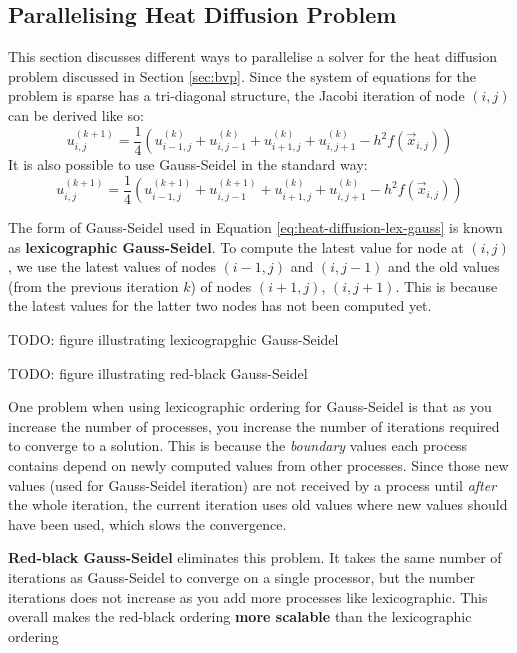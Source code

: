 \documentclass{article}
\begin{document}
\subsection{Parallelising Heat Diffusion Problem}
\label{sec:heat-diffusion-parallel}

This section discusses different ways to parallelise a solver for the heat diffusion problem discussed in Section \ref{sec:bvp}. Since the system of equations for the problem is sparse has a tri-diagonal structure, the Jacobi iteration of node $(i, j)$ can be derived like so:
\begin{equation}
	u_{i,j}^{(k + 1)} = \frac{1}{4}\left( u_{i-1,j}^{(k)} + u_{i,j-1}^{(k)} + u_{i+1,j}^{(k)} + u_{i,j+1}^{(k)} - h^2f(\vec{x}_{i,j}) \right)
	\label{eq:heat-diffusion-jacobi}
\end{equation}
It is also possible to use Gauss-Seidel in the standard way:
\begin{equation}
	u_{i,j}^{(k + 1)} = \frac{1}{4}\left( u_{i-1,j}^{(k+1)} + u_{i,j-1}^{(k+1)} + u_{i+1,j}^{(k)} + u_{i,j+1}^{(k)} - h^2f(\vec{x}_{i,j}) \right)
	\label{eq:heat-diffusion-lex-gauss}
\end{equation}

The form of Gauss-Seidel used in Equation \ref{eq:heat-diffusion-lex-gauss} is known as \textbf{lexicographic Gauss-Seidel}. To compute the latest value for node at $(i, j)$, we use the latest values of nodes $(i - 1, j)$ and $(i, j - 1)$ and the old values (from the previous iteration $k$) of nodes $(i + 1, j)$, $(i, j + 1)$. This is because the latest values for the latter two nodes has not been computed yet.

TODO: figure illustrating lexicograpghic Gauss-Seidel

TODO: figure illustrating red-black Gauss-Seidel

One problem when using lexicographic ordering for Gauss-Seidel is that as you increase the number of processes, you increase the number of iterations required to converge to a solution. This is because the \textit{boundary} values each process contains depend on newly computed values from other processes. Since those new values (used for Gauss-Seidel iteration) are not received by a process until \textit{after} the whole iteration, the current iteration uses old values where new values should have been used, which slows the convergence.

\textbf{Red-black Gauss-Seidel} eliminates this problem. It takes the same number of iterations as Gauss-Seidel to converge on a single processor, but the number iterations does not increase as you add more processes like lexicographic. This overall makes the red-black ordering \textbf{more scalable} than the lexicographic ordering
\end{document}
